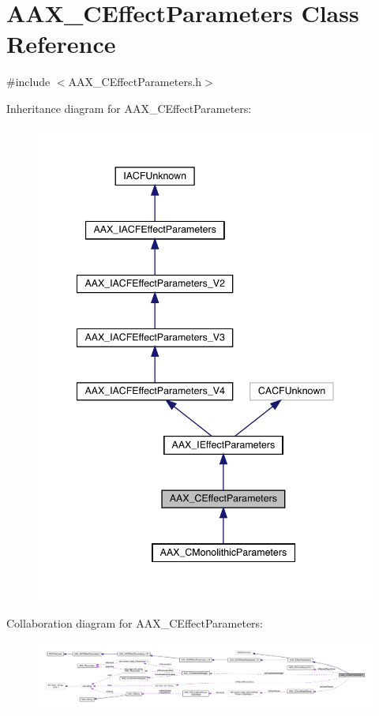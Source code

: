 \hypertarget{a01481}{}\section{A\+A\+X\+\_\+\+C\+Effect\+Parameters Class Reference}
\label{a01481}


{\ttfamily \#include $<$A\+A\+X\+\_\+\+C\+Effect\+Parameters.\+h$>$}



Inheritance diagram for A\+A\+X\+\_\+\+C\+Effect\+Parameters\+:
\nopagebreak
\begin{figure}[H]
\begin{center}
\leavevmode
\includegraphics[width=342pt]{a01480}
\end{center}
\end{figure}


Collaboration diagram for A\+A\+X\+\_\+\+C\+Effect\+Parameters\+:
\nopagebreak
\begin{figure}[H]
\begin{center}
\leavevmode
\includegraphics[width=350pt]{a01479}
\end{center}
\end{figure}


